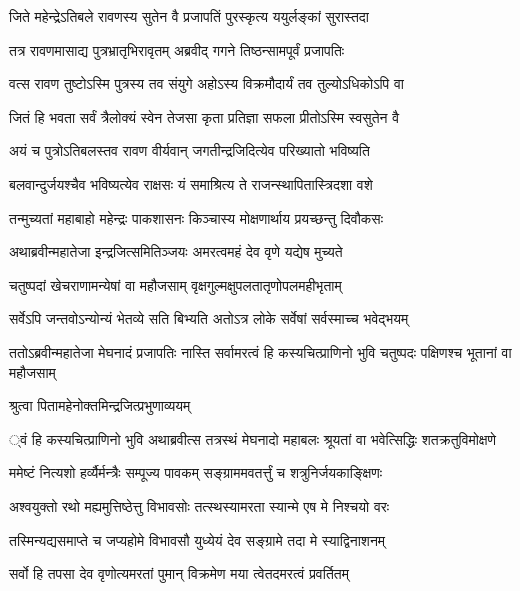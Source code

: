 
\twolineshloka
{जिते महेन्द्रेऽतिबले रावणस्य सुतेन वै}
{प्रजापतिं पुरस्कृत्य ययुर्लङ्कां सुरास्तदा} %

\twolineshloka
{तत्र रावणमासाद्य पुत्रभ्रातृभिरावृतम्}
{अब्रवीद् गगने तिष्ठन्सामपूर्वं प्रजापतिः} %

\twolineshloka
{वत्स रावण तुष्टोऽस्मि पुत्रस्य तव संयुगे}
{अहोऽस्य विक्रमौदार्यं तव तुल्योऽधिकोऽपि वा} %

\twolineshloka
{जितं हि भवता सर्वं त्रैलोक्यं स्वेन तेजसा}
{कृता प्रतिज्ञा सफला प्रीतोऽस्मि स्वसुतेन वै} %

\twolineshloka
{अयं च पुत्रोऽतिबलस्तव रावण वीर्यवान्}
{जगतीन्द्रजिदित्येव परिख्यातो भविष्यति} %

\twolineshloka
{बलवान्दुर्जयश्चैव भविष्यत्येव राक्षसः}
{यं समाश्रित्य ते राजन्स्थापितास्त्रिदशा वशे} %

\twolineshloka
{तन्मुच्यतां महाबाहो महेन्द्रः पाकशासनः}
{किञ्चास्य मोक्षणार्थाय प्रयच्छन्तु दिवौकसः} %

\twolineshloka
{अथाब्रवीन्महातेजा इन्द्रजित्समितिञ्जयः}
{अमरत्वमहं देव वृणे यद्येष मुच्यते} %

\twolineshloka
{चतुष्पदां खेचराणामन्येषां वा महौजसाम्}
{वृक्षगुल्मक्षुपलतातृणोपलमहीभृताम्} %

\twolineshloka
{सर्वेऽपि जन्तवोऽन्योन्यं भेतव्ये सति बिभ्यति}
{अतोऽत्र लोके सर्वेषां सर्वस्माच्च भवेद्भयम्} %

\threelineshloka
{ततोऽब्रवीन्महातेजा मेघनादं प्रजापतिः}
{नास्ति सर्वामरत्वं हि कस्यचित्प्राणिनो भुवि}
{चतुष्पदः पक्षिणश्च भूतानां वा महौजसाम्} %

\onelineshloka
{श्रुत्वा पितामहेनोक्तमिन्द्रजित्प्रभुणाव्ययम्} %

\threelineshloka
{्वं हि कस्यचित्प्राणिनो भुवि}
{अथाब्रवीत्स तत्रस्थं मेघनादो महाबलः}
{श्रूयतां वा भवेत्सिद्धिः शतक्रतुविमोक्षणे} %

\twolineshloka
{ममेष्टं नित्यशो हर्व्यैर्मन्त्रैः सम्पूज्य पावकम्}
{सङ्ग्राममवतर्त्तुं च शत्रुनिर्जयकाङ्क्षिणः} %

\twolineshloka
{अश्वयुक्तो रथो मह्यमुत्तिष्ठेत्तु विभावसोः}
{तत्स्थस्यामरता स्यान्मे एष मे निश्चयो वरः} %

\twolineshloka
{तस्मिन्यद्यसमाप्ते च जप्यहोमे विभावसौ}
{युध्येयं देव सङ्ग्रामे तदा मे स्याद्विनाशनम्} %

\twolineshloka
{सर्वो हि तपसा देव वृणोत्यमरतां पुमान्}
{विक्रमेण मया त्वेतदमरत्वं प्रवर्तितम्} %

